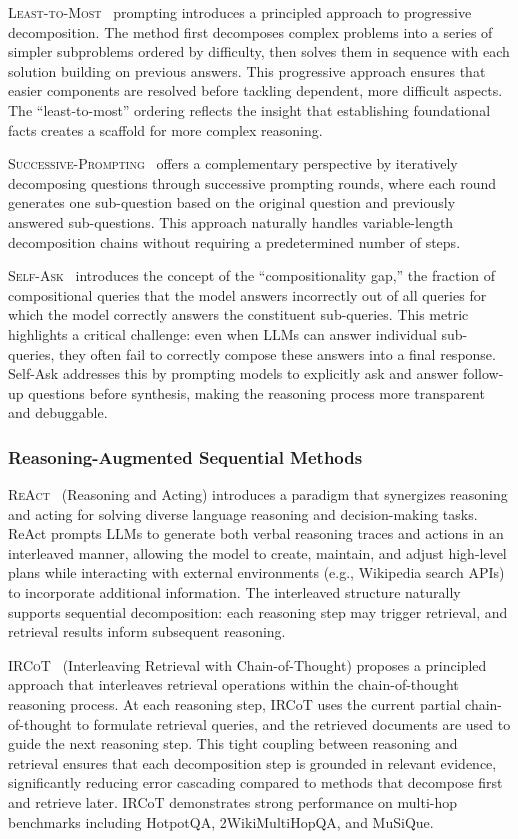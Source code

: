 \documentclass{article}
\begin{document}
\textsc{Least-to-Most}~\citep{Least-to-Most} prompting introduces a principled approach to progressive decomposition. The method first decomposes complex problems into a series of simpler subproblems ordered by difficulty, then solves them in sequence with each solution building on previous answers. This progressive approach ensures that easier components are resolved before tackling dependent, more difficult aspects. The ``least-to-most'' ordering reflects the insight that establishing foundational facts creates a scaffold for more complex reasoning.

\textsc{Successive-Prompting}~\citep{Successive-Prompting} offers a complementary perspective by iteratively decomposing questions through successive prompting rounds, where each round generates one sub-question based on the original question and previously answered sub-questions. This approach naturally handles variable-length decomposition chains without requiring a predetermined number of steps.

\textsc{Self-Ask}~\citep{Self-Ask} introduces the concept of the ``compositionality gap,'' the fraction of compositional queries that the model answers incorrectly out of all queries for which the model correctly answers the constituent sub-queries. This metric highlights a critical challenge: even when LLMs can answer individual sub-queries, they often fail to correctly compose these answers into a final response. Self-Ask addresses this by prompting models to explicitly ask and answer follow-up questions before synthesis, making the reasoning process more transparent and debuggable.

\subsubsection{Reasoning-Augmented Sequential Methods}

\textsc{ReAct}~\citep{ReAct} (Reasoning and Acting) introduces a paradigm that synergizes reasoning and acting for solving diverse language reasoning and decision-making tasks. ReAct prompts LLMs to generate both verbal reasoning traces and actions in an interleaved manner, allowing the model to create, maintain, and adjust high-level plans while interacting with external environments (e.g., Wikipedia search APIs) to incorporate additional information. The interleaved structure naturally supports sequential decomposition: each reasoning step may trigger retrieval, and retrieval results inform subsequent reasoning.

\textsc{IRCoT}~\citep{IRCoT} (Interleaving Retrieval with Chain-of-Thought) proposes a principled approach that interleaves retrieval operations within the chain-of-thought reasoning process. At each reasoning step, IRCoT uses the current partial chain-of-thought to formulate retrieval queries, and the retrieved documents are used to guide the next reasoning step. This tight coupling between reasoning and retrieval ensures that each decomposition step is grounded in relevant evidence, significantly reducing error cascading compared to methods that decompose first and retrieve later. IRCoT demonstrates strong performance on multi-hop benchmarks including HotpotQA, 2WikiMultiHopQA, and MuSiQue.
\end{document}
